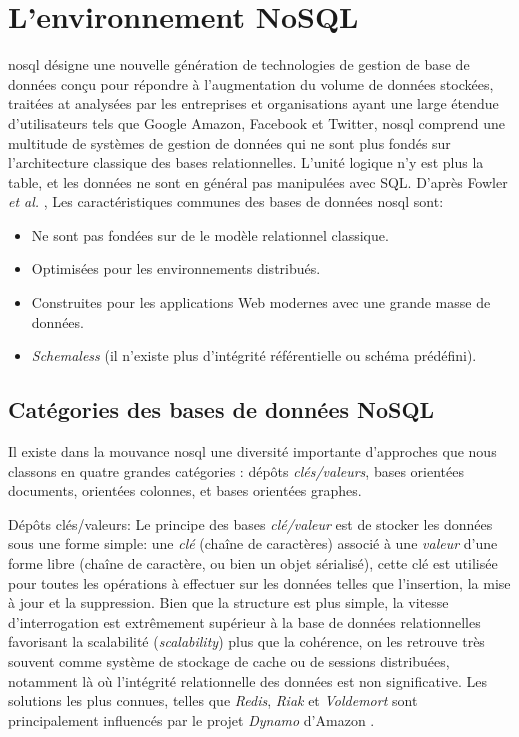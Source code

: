 \section{L'environnement NoSQL}
\label{sec:nosql}
\acrshort{nosql} désigne une nouvelle génération de technologies de
gestion de base de données conçu pour répondre à l'augmentation du
volume de données stockées, traitées at analysées par les entreprises
et organisations ayant une large étendue d'utilisateurs tels que
Google Amazon, Facebook et Twitter, \acrshort{nosql} comprend une
multitude de systèmes de gestion de données qui ne sont plus fondés
sur l'architecture classique des bases relationnelles. L'unité logique
n'y est plus la table, et les données ne sont en général pas
manipulées avec \textsc{SQL}.  D'après Fowler \textit{et al.}
\cite{sadalage2012nosql}, Les caractéristiques communes des bases de
données \acrshort{nosql} sont:

\begin{itemize}\renewcommand\labelitemi{--}
\item Ne sont pas fondées sur de le modèle relationnel classique.
\item Optimisées pour les environnements distribués.
\item Construites pour les applications Web modernes avec une grande
  masse de données.
\item \emph{Schemaless} (il n'existe plus d'intégrité référentielle ou
  schéma prédéfini).
\end{itemize}

  \subsection{Catégories des bases de données NoSQL}
  \label{sec:cat-nosql}
  Il existe dans la mouvance \acrshort{nosql} une diversité importante
  d'approches que nous classons en quatre grandes catégories
  \cite{sadalage2012nosql}: dépôts \textit {clés/valeurs}, bases
  orientées documents, orientées colonnes, et bases orientées
  graphes.\bigskip

  \textsf{Dépôts clés/valeurs}: Le principe des bases
  \textit{clé/valeur} est de stocker les données sous une forme
  simple: une \emph{clé } (chaîne de caractères) associé à une
  \emph{valeur} d'une forme libre (chaîne de caractère, ou bien un
  objet sérialisé), cette clé est utilisée pour toutes les opérations
  à effectuer sur les données telles que l'insertion, la mise à jour
  et la suppression. Bien que la structure est plus simple, la vitesse
  d'interrogation est extrêmement supérieur à la base de données
  relationnelles favorisant la scalabilité (\emph{scalability}) plus
  que la cohérence, on les retrouve très souvent comme système de
  stockage de cache ou de sessions distribuées, notamment là où
  l'intégrité relationnelle des données est non significative. Les
  solutions les plus connues, telles que \emph{Redis}, \emph{Riak} et
  \emph{Voldemort} sont principalement influencés par le projet
  \emph{Dynamo} d'Amazon \cite{decandia2007dynamo}.\bigskip

